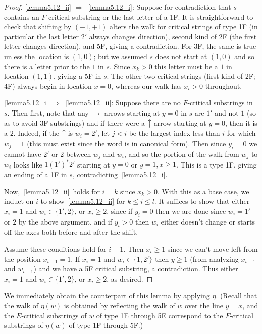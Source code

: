 \documentclass[ALCO,ThmDefs,Unicode,epreuves]{cedram}
\newcommand{\east}[1]{\ensuremath{\xrightarrow{\ #1\ }}}
\newcommand{\north}[1]{\ensuremath{\big \uparrow \!\text{\raisebox{.1ex}{\scriptsize $#1$}}}}
\begin{document}
\begin{proof}
\ref{lemma5.12_ii} $\Rightarrow$~\ref{lemma5.12_i}: Suppose for contradiction that $s$ contains an $F$-critical substring or the last letter of a 1F. It is straightforward to check that shifting by $(-1,+1)$ alters the walk for critical strings of type 1F (in particular the last letter $2'$ always changes direction), second kind of 2F (the first letter changes direction), and 5F, giving a contradiction. For 3F, the same is true unless the location is $(1,0)$; but we assumed $s$ does not start at $(1,0)$ and so there is a letter prior to the $1$ in $s$. Since $x_k>0$ this letter must be a $1$ in location $(1,1)$, giving a 5F in $s$. The other two critical strings (first kind of 2F; 4F) always begin in location $x=0$, whereas our walk has $x_i > 0$ throughout.

\ref{lemma5.12_i} $\Rightarrow$~\ref{lemma5.12_ii}: Suppose there are no $F$-critical substrings in $s$. Then first, note that any $\east{}$ arrows starting at $y=0$ in $s$ are $1'$ and not $1$ (so as to avoid 3F substrings) and if there were a $\north{}$ arrow starting at $y=0$, then it is a $2$. Indeed, if the $\north{}$ is $w_i=2'$, let $j<i$ be the largest index less than $i$ for which $w_j=1$ (this must exist since the word is in canonical form). Then since $y_i=0$ we cannot have $2'$ or $2$ between $w_j$ and $w_i$, and so the portion of the walk from $w_j$ to $w_i$ looks like $1(1')^\ast 2'$ starting at $y=0$ or $y=1,x\ge 1$. This is a type 1F, giving an ending of a 1F in $s$, contradicting~\ref{lemma5.12_i}.

Now,~\ref{lemma5.12_ii}~holds for $i=k$ since $x_k>0$. With this as a base case, we induct on $i$ to show~\ref{lemma5.12_ii} for $k\le i\le l$. It suffices to show that either $x_i=1$ and $w_i\in \{1',2\}$, or $x_i\ge 2$, since if $y_i=0$ then we are done since $w_i=1'$ or $2$ by the above argument, and if $y_i>0$ then $w_i$ either doesn't change or starts off the axes both before and after the shift.

Assume these conditions hold for $i-1$. Then $x_i\ge 1$ since we can't move left from the position $x_{i-1}=1$. If $x_i=1$ and $w_i\in \{1,2'\}$ then $y\ge 1$ (from analyzing $x_{i-1}$ and $w_{i-1}$) and we have a 5F critical substring, a contradiction. Thus either $x_i=1$ and $w_i\in \{1',2\}$, or $x_i\ge 2$, as desired.
\end{proof}

We immediately obtain the counterpart of this lemma by applying $\eta$. (Recall that the walk of $\eta(w)$ is obtained by reflecting the walk of $w$ over the line $y=x$, and the $E$-critical substrings of $w$ of type 1E through 5E correspond to the $F$-critical substrings of $\eta(w)$ of type 1F through 5F.)
\end{document}
